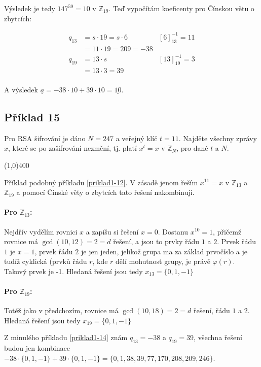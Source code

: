 \documentclass{article}
\begin{document}
Výsledek je tedy $147^{59} = 10$ v $\mathbb{Z}_{19}$. Teď vypočítám koeficenty pro Čínskou větu o zbytcích:

\begin{align*}
q_{13} & = s\cdot 19 = s\cdot 6 & \left[ 6\right]^{-1}_{13} = 11\\
		& = 11 \cdot 19 = 209 = -38 \\
q_{19} & = 13 \cdot s & \left[ 13\right]^{-1}_{19} = 3\\
		& = 13 \cdot 3 = 39 \\
\end{align*}

A výsledek $\underline{a} = -38\cdot10 + 39\cdot10 = \underline{10}$.

\subsection{Příklad 15}
Pro RSA šifrování je dáno $N = 247$ a veřejný klíč $t = 11$. Najděte všechny zprávy $x$, které se po zašifrování nezmění, tj. platí $x^t = x$ v $\mathbb{Z}_N$, pro dané $t$ a $N$. 

\line(1,0){400}

Příklad podobný příkladu \ref{priklad1-12}. V zásadě jenom řeším $x^{11} = x$ v $\mathbb{Z}_{13}$ a $\mathbb{Z}_{19}$ a pomocí Čínské věty o zbytcích tato řešení nakombinuji.

\paragraph{Pro $\mathbb{Z}_{13}$: } Nejdřív vydělím rovnici $x$ a zapíšu si řešení $x = 0$. Dostanu $x^{10} = 1$, přičemž rovnice má $\gcd(10,12) = 2 = d$ řešení, a jsou to prvky řádu $1$ a $2$. Prvek řádu $1$ je $x = 1$, prvek řádu $2$ je jen jeden, jelikož grupa ma za základ prvočíslo a je tudíž cyklická (prvků řádu $r$, kde $r$ dělí mohutnost grupy, je právě $\varphi(r)$. Takový prvek je -1.
Hledaná řešení jsou tedy $x_{13} = \{0, 1, -1\}$

\paragraph{Pro $\mathbb{Z}_{19}$: } Totéž jako v předchozím, rovnice má $\gcd(10,18) = 2 = d$ řešení, řádu $1$ a $2$. Hledaná řešení jsou tedy $x_{19} = \{0, 1, -1\}$

Z minulého příkladu \ref{priklad1-14} znám $q_{13} = -38$ a $q_{19} = 39$, všechna řešení budou jen kombinace $-38\cdot\{0,1,-1\} + 39\cdot\{0,1,-1\} = \{0,1,38,39,77,170,208,209,246\}$. 
\end{document}
